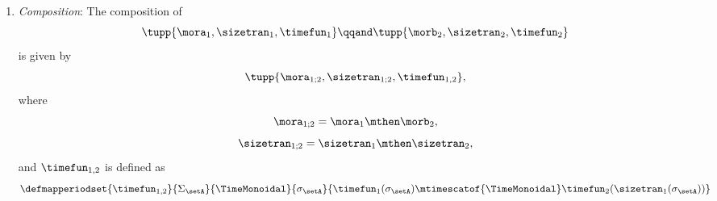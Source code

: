 \begin{definition}
\begin{enumerate}
        \item \emph{Composition}: The composition of
              \begin{equation}
                  \tupp{\mora_1, \sizetran_1,  \timefun_1  }
                  \qqand
                  \tupp{\morb_2, \sizetran_2,  \timefun_2  }
              \end{equation}
              is given by
              \begin{equation}
                  \tupp{
                      \mora_{1;2},
                      \sizetran_{1;2},
                      \timefun_{1,2}
                  },
              \end{equation}
              where
              \begin{equation}
                  \mora_{1;2} = \mora_1 \mthen \morb_2,
              \end{equation}
              \begin{equation}
                  \sizetran_{1;2} = \sizetran_1 \mthen \sizetran_2,
              \end{equation}
              and $\timefun_{1,2}$ is defined as
              \begin{equation}
                  \defmapperiodset{
                      \timefun_{1,2}
                  }{
                      \Sigma_{\setA}
                  }{
                      \TimeMonoidal
                  }{
                      \sigma_{\setA}
                  }{
                      \timefun_1(\sigma_{\setA}) \mtimescatof{\TimeMonoidal} \timefun_2(\sizetran_1(\sigma_{\setA}))
                  }
              \end{equation}
    \end{enumerate}
\end{definition}

